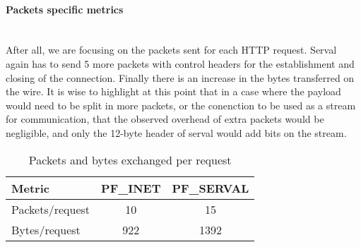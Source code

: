 \paragraph{Packets specific metrics} \hfill \\
After all, we are focusing on the packets sent for each HTTP request.
Serval again has to send 5 more packets with control headers for the establishment and closing of the connection.
Finally there is an increase in the bytes transferred on the wire.
It is wise to highlight at this point that in a case where the payload would need to be split in more packets, or the conenction to be used as a stream for communication, that the observed overhead of extra packets would be negligible, and only the 12-byte header of serval would add bits on the stream.
\begin{table}
\begin{center}
  \begin{tabular}{l||c|c}
  	\toprule
  	Metric				&	PF\_INET	&	PF\_SERVAL	\\
  	\midrule
    Packets/request		&	10			&	15			\\
    Bytes/request		&	922			&	1392		\\
    \bottomrule
  \end{tabular}
  \caption[Benchmark: Packets and bytes exchanged per request]{Packets and bytes exchanged per request}
  \label{table:packets}
\end{center}
\end{table}



\newpage
